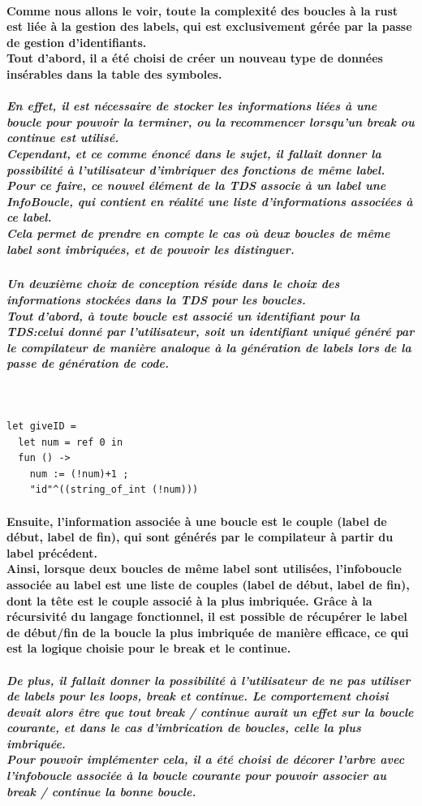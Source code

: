 \documentclass[french]{article}
\begin{document}
\paragraph*{Comme nous allons le voir, toute la complexité des boucles à la rust est liée à la gestion des labels, qui est exclusivement gérée par la passe de gestion d'identifiants.\\
Tout d'abord, il a été choisi de créer un nouveau type de données insérables dans la table des symboles.}
\subparagraph*{En effet, il est nécessaire de stocker les informations liées à une boucle pour pouvoir la terminer, ou la recommencer
lorsqu'un break ou continue est utilisé.\\
Cependant, et ce comme énoncé dans le sujet, il fallait donner la possibilité à l'utilisateur d'imbriquer des fonctions de même label.\\
Pour ce faire, ce nouvel élément de la TDS associe à un label une InfoBoucle, qui contient en réalité une liste d'informations associées à ce label.\\
Cela permet de prendre en compte le cas où deux boucles de même label sont imbriquées, et de pouvoir les distinguer. \\} %
\subparagraph*{Un deuxième choix de conception réside dans le choix des informations stockées dans la TDS pour les boucles.\\
Tout d'abord, à toute boucle est associé un identifiant pour la TDS:\@soit celui donné par l'utilisateur, soit un identifiant uniqué généré par le compilateur
de manière analoque à la génération de labels lors de la passe de génération de code.}
\,
\begin{lstlisting}
let giveID = 
  let num = ref 0 in
  fun () ->
    num := (!num)+1 ;
    "id"^((string_of_int (!num)))
\end{lstlisting}
\paragraph{Ensuite, l'information associée à une boucle est le couple (label de début, label de fin), qui sont générés par le compilateur à partir du label précédent. \\
Ainsi, lorsque deux boucles de même label sont utilisées, l'infoboucle associée au label est une liste de couples 
(label de début, label de fin), dont la tête est le couple associé à la plus imbriquée.
Grâce à la récursivité du langage fonctionnel, il est possible de récupérer le label de début/fin de la boucle la plus imbriquée de manière efficace,
ce qui est la logique choisie pour le break et le continue.}
\subparagraph{De plus, il fallait donner la possibilité à l'utilisateur de ne pas utiliser de labels pour les loops, break et continue. Le comportement
choisi devait alors être que tout break / continue aurait un effet sur la boucle courante, et dans le cas d'imbrication de boucles, celle la 
plus imbriquée.\\
Pour pouvoir implémenter cela, il a été choisi de \textit{décorer l'arbre} avec l'infoboucle associée à la boucle courante pour pouvoir associer au break / continue
la bonne boucle.}
\end{document}
